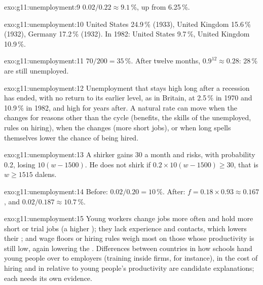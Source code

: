 \begin{solution}{exo:g11:unemployment:9}
$0.02/0.22 \approx 9.1\,\%$, up from 6.25\,\%.
\end{solution}

\begin{solution}{exo:g11:unemployment:10}
United States 24.9\,\% (1933), United Kingdom 15.6\,\% (1932), Germany 17.2\,\% (1932). In 1982: United States 9.7\,\%, United Kingdom 10.9\,\%.
\end{solution}

\begin{solution}{exo:g11:unemployment:11}
$70/200 = 35\,\%$. After twelve months, $0.9^{12} \approx 0.28$: 28\,\% are still unemployed.
\end{solution}

\begin{solution}{exo:g11:unemployment:12}
Unemployment that stays high long after a recession has ended, with no return to its earlier level, as in Britain, at 2.5\,\% in 1970 and 10.9\,\% in 1982, and high for
years after. A natural rate can move when the  changes for reasons other than the cycle (benefits, the skills of the unemployed, rules on hiring), when the
 changes (more short jobs), or when long spells themselves lower the chance of being hired.
\end{solution}

\begin{solution}{exo:g11:unemployment:13}
A shirker gains 30 a month and risks, with probability 0.2, losing $10(w - 1500)$. He does not shirk if $0.2 \times 10 (w - 1500) \ge 30$, that is $w \ge 1515$ dalens.
\end{solution}

\begin{solution}{exo:g11:unemployment:14}
Before: $0.02/0.20 = 10\,\%$. After: $f = 0.18 \times 0.93 \approx 0.167$, and $0.02/0.187 \approx 10.7\,\%$.
\end{solution}

\begin{solution}{exo:g11:unemployment:15}
Young workers change jobs more often and hold more short or trial jobs (a higher ); they lack experience and contacts, which lowers their ;
and wage floors or hiring rules weigh most on those whose productivity is still low, again lowering the . Differences between countries in how schools hand
young people over to employers (training inside firms, for instance), in the cost of hiring and in  relative to young people's productivity are candidate
explanations; each needs its own evidence.
\end{solution}

